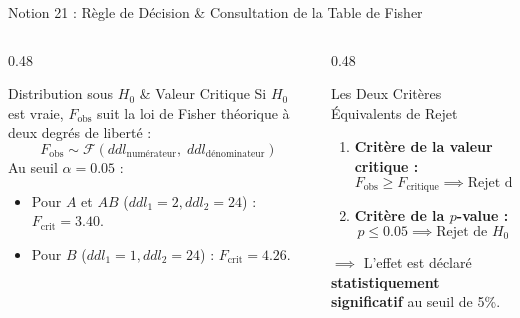 \documentclass[aspectratio=169,10pt]{beamer}
\begin{document}
\begin{frame}{Notion 21 : Règle de Décision \& Consultation de la Table de Fisher}
  \begin{columns}[onlytextwidth, T]
    \begin{column}{0.48\linewidth}
      \begin{conceptbox}{Distribution sous $H_0$ \& Valeur Critique}
        Si $H_0$ est vraie, $F_{\text{obs}}$ suit la loi de Fisher théorique à deux degrés de liberté :
        \begin{equation*}
          F_{\text{obs}} \sim \mathcal{F}(ddl_{\text{numérateur}}, \; ddl_{\text{dénominateur}})
        \end{equation*}
        Au seuil $\alpha = 0.05$ :
        \begin{itemize}
          \item Pour $A$ et $AB$ ($ddl_1 = 2, ddl_2 = 24$) : $F_{\text{crit}} = \mathbf{3.40}$.
          \item Pour $B$ ($ddl_1 = 1, ddl_2 = 24$) : $F_{\text{crit}} = \mathbf{4.26}$.
        \end{itemize}
      \end{conceptbox}
    \end{column}
    \begin{column}{0.48\linewidth}
      \begin{takeawaybox}{Les Deux Critères Équivalents de Rejet}
        \begin{enumerate}
          \item \textbf{Critère de la valeur critique :}
            \begin{equation*}
              F_{\text{obs}} \ge F_{\text{critique}} \implies \text{Rejet de } H_0
            \end{equation*}
          \item \textbf{Critère de la $p$-value :}
            \begin{equation*}
              p \le 0.05 \implies \text{Rejet de } H_0
            \end{equation*}
        \end{enumerate}
        $\implies$ L'effet est déclaré \textbf{statistiquement significatif} au seuil de 5\%.
      \end{takeawaybox}
    \end{column}
  \end{columns}
\end{frame}
\end{document}
